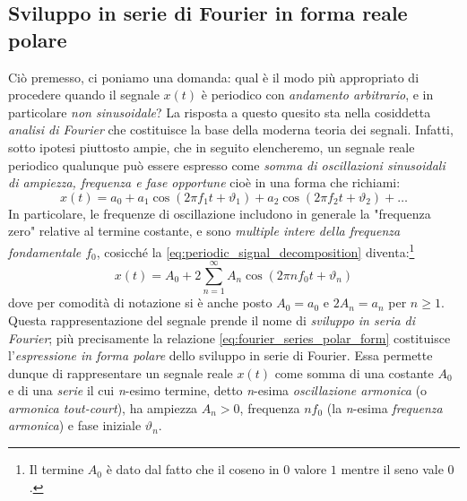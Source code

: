 \documentclass[12pt,oneside,openany]{memoir}
\numberwithin{equation}{subsection}
\begin{document}

\subsection{Sviluppo in serie di Fourier in forma reale polare}
Ci\`o premesso, ci poniamo una domanda: qual \`e il modo pi\`u appropriato di
procedere quando il segnale $x(t)$ \`e periodico con \textit{andamento
arbitrario}, e in particolare \textit{non sinusoidale}? La risposta a questo
quesito sta nella cosiddetta \textit{analisi di Fourier} che costituisce la
base della moderna teoria dei segnali. Infatti, sotto ipotesi piuttosto ampie,
che in seguito elencheremo, un segnale reale periodico qualunque pu\`o essere
espresso come \textit{somma di oscillazioni sinusoidali di ampiezza, frequenza e
fase opportune} cio\`e in una forma che richiami:
\begin{equation}\label{eq:periodic_signal_decomposition}
	x(t) = a_0 + a_1 \cos(2 \pi f_1 t + \vartheta_1) + a_2 \cos(2 \pi f_2 t
	+ \vartheta_2) + \dots
\end{equation}
In particolare, le frequenze di oscillazione includono in generale la "frequenza
zero" relative al termine costante, e sono \textit{multiple intere della
frequenza fondamentale $f_0$}, cosicch\'e la
\eqref{eq:periodic_signal_decomposition} diventa:\footnote{Il termine $A_0$ \`e
dato dal fatto che il coseno in $0$ valore $1$ mentre il seno vale $0$.}
\begin{equation}\label{eq:fourier_series_polar_form}
	x(t) = A_0 + 2 \sum_{n = 1}^{\infty} A_n \cos(2 \pi n f_0 t + \vartheta_n)
\end{equation}
dove per comodit\`a di notazione si \`e anche posto $A_0 = a_0$ e $2A_n = a_n$
per $n \geq 1$. Questa rappresentazione del segnale prende il nome di
\textit{sviluppo in seria di Fourier}; pi\`u precisamente la relazione
\eqref{eq:fourier_series_polar_form} costituisce l'\textit{espressione in forma
polare} dello sviluppo in serie di Fourier. Essa permette dunque di
rappresentare un segnale reale $x(t)$ come somma di una costante $A_0$ e di una
\textit{serie} il cui \textit{n}-esimo termine, detto \textit{n}-esima
\textit{oscillazione armonica} (o \textit{armonica tout-court}), ha ampiezza
$A_n > 0$, frequenza $nf_0$ (la \textit{n}-esima \textit{frequenza armonica}) e
fase iniziale $\vartheta_n$.
\end{document}
